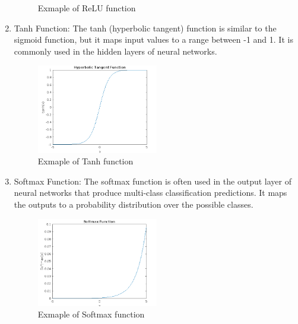 \begin{enumerate}
\begin{center}
\begin{figure}[!ht]
                \caption{Exmaple of ReLU function}
                \label{fig:relu}
            \end{figure}
        \end{center}
        \item Tanh Function: The tanh (hyperbolic tangent) function is similar to the sigmoid function, but it maps input values to a range
        between -1 and 1. It is commonly used in the hidden layers of neural networks.
        \begin{center}
            \begin{figure}[!ht]
                \centering
                \includegraphics[width=0.5\textwidth]{figures/tanh}
                \caption{Exmaple of Tanh function}
                \label{fig:tahn}
            \end{figure}
        \end{center}
        \item Softmax Function: The softmax function is often used in the output layer of neural networks that produce multi-class
        classification predictions. It maps the outputs to a probability distribution over the possible classes.
        \begin{center}
            \begin{figure}[!ht]
                \centering
                \includegraphics[width=0.5\textwidth]{figures/softmax}
                \caption{Exmaple of Softmax function}
                \label{fig:sigmsoftmaxoid}
            \end{figure}
        \end{center}

\end{enumerate}
